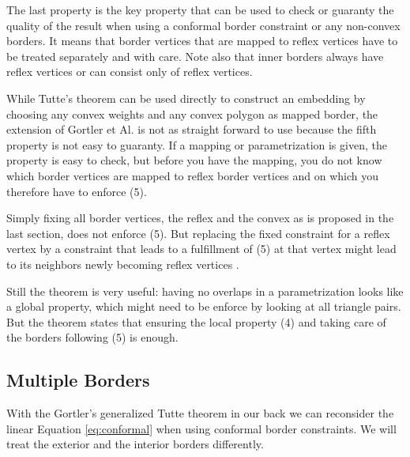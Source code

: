 The last property is the key property that can be used to check or guaranty the quality of the result when using a conformal border constraint or any non-convex borders. It means that border vertices that are mapped to reflex vertices have to be treated separately and with care. Note also that inner borders always have reflex vertices  or can consist only of reflex vertices.

While Tutte's theorem can be used directly to construct an embedding by choosing any convex weights and any convex polygon as mapped border, the extension of Gortler et Al. is not as straight forward to use because the fifth property is not easy to guaranty. If a mapping or parametrization is given, the property is easy to check, but before you have the mapping, you do not know which border vertices are mapped to reflex border vertices and on which you therefore have to enforce (5). 

Simply fixing all border vertices, the reflex and the convex as is proposed in the last section, does not enforce (5). But replacing the fixed constraint for a reflex vertex by a constraint that leads to a fulfillment of (5) at that vertex might lead to its neighbors newly becoming reflex vertices .

Still the theorem is very useful: having no overlaps in a parametrization looks like a global property, which might need to be enforce by looking at all triangle pairs. But the theorem states that ensuring the local property (4) and taking care of the borders following (5) is enough.


\subsection{Multiple Borders}
With the Gortler's generalized Tutte theorem in our back we can reconsider the linear Equation \ref{eq:conformal} when using conformal border constraints. We will treat the exterior and the interior borders differently. 
